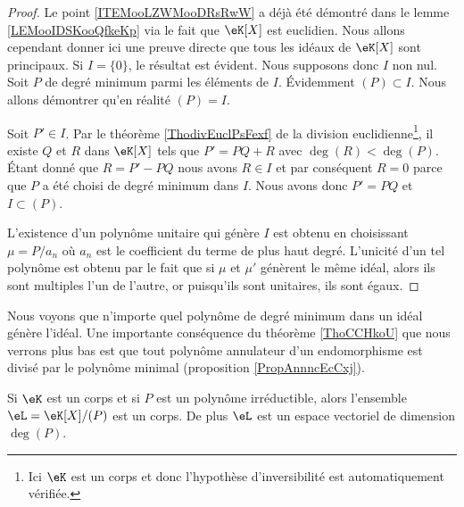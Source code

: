 \begin{proof}
    Le point \ref{ITEMooLZWMooDRsRwW} a déjà été démontré dans le lemme \ref{LEMooIDSKooQfkeKp} via le fait que \( \eK[X]\) est euclidien. Nous allons cependant donner ici une preuve directe que tous les idéaux de \( \eK[X]\) sont principaux. Si \( I=\{ 0 \}\), le résultat est évident. Nous supposons donc \( I\) non nul. Soit \( P\) de degré minimum parmi les éléments de \( I\). Évidemment \( (P)\subset I\). Nous allons démontrer qu'en réalité \( (P)=I\).

    Soit \( P'\in I\). Par le théorème \ref{ThodivEuclPsFexf} de la division euclidienne\footnote{Ici \( \eK\) est un corps et donc l'hypothèse d'inversibilité est automatiquement vérifiée.}, il existe \( Q\) et \( R\) dans \( \eK[X]\) tels que \( P'=PQ+R\) avec \( \deg(R)<\deg(P)\). Étant donné que \( R=P'-PQ\) nous avons \( R\in I\) et par conséquent \( R=0\) parce que \( P\) a été choisi de degré minimum dans \( I\). Nous avons donc \( P'=PQ\) et \( I\subset (P)\).

    L'existence d'un polynôme unitaire qui génère \( I\) est obtenu en choisissant \( \mu =P/a_n\) où \( a_n\) est le coefficient du terme de plus haut degré. L'unicité d'un tel polynôme est obtenu par le fait que si \( \mu \) et \( \mu' \) génèrent le même idéal, alors ils sont multiples l'un de l'autre, or puisqu'ils sont unitaires, ils sont égaux.
\end{proof}
Nous voyons que n'importe quel polynôme de degré minimum dans un idéal génère l'idéal. Une importante conséquence du théorème \ref{ThoCCHkoU} que nous verrons plus bas est que tout polynôme annulateur d'un endomorphisme est divisé par le polynôme minimal (proposition \ref{PropAnnncEcCxj}).

\begin{corollary}       \label{CorsLGiEN}
    Si \( \eK\) est un corps et si \( P\) est un polynôme irréductible, alors l'ensemble \( \eL=\eK[X]/(P)\) est un corps. De plus \( \eL\) est un espace vectoriel de dimension \( \deg(P)\).
\end{corollary}

